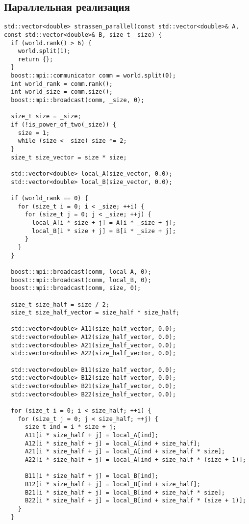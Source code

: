 \documentclass[a4paper, 14pt]{extarticle}
\begin{document}
\subsection{Параллельная реализация}
\begin{lstlisting}
std::vector<double> strassen_parallel(const std::vector<double>& A, const std::vector<double>& B, size_t _size) {
  if (world.rank() > 6) {
    world.split(1);
    return {};
  }
  boost::mpi::communicator comm = world.split(0);
  int world_rank = comm.rank();
  int world_size = comm.size();
  boost::mpi::broadcast(comm, _size, 0);

  size_t size = _size;
  if (!is_power_of_two(_size)) {
    size = 1;
    while (size < _size) size *= 2;
  }
  size_t size_vector = size * size;

  std::vector<double> local_A(size_vector, 0.0);
  std::vector<double> local_B(size_vector, 0.0);

  if (world_rank == 0) {
    for (size_t i = 0; i < _size; ++i) {
      for (size_t j = 0; j < _size; ++j) {
        local_A[i * size + j] = A[i * _size + j];
        local_B[i * size + j] = B[i * _size + j];
      }
    }
  }

  boost::mpi::broadcast(comm, local_A, 0);
  boost::mpi::broadcast(comm, local_B, 0);
  boost::mpi::broadcast(comm, size, 0);

  size_t size_half = size / 2;
  size_t size_half_vector = size_half * size_half;

  std::vector<double> A11(size_half_vector, 0.0);
  std::vector<double> A12(size_half_vector, 0.0);
  std::vector<double> A21(size_half_vector, 0.0);
  std::vector<double> A22(size_half_vector, 0.0);

  std::vector<double> B11(size_half_vector, 0.0);
  std::vector<double> B12(size_half_vector, 0.0);
  std::vector<double> B21(size_half_vector, 0.0);
  std::vector<double> B22(size_half_vector, 0.0);

  for (size_t i = 0; i < size_half; ++i) {
    for (size_t j = 0; j < size_half; ++j) {
      size_t ind = i * size + j;
      A11[i * size_half + j] = local_A[ind];
      A12[i * size_half + j] = local_A[ind + size_half];
      A21[i * size_half + j] = local_A[ind + size_half * size];
      A22[i * size_half + j] = local_A[ind + size_half * (size + 1)];

      B11[i * size_half + j] = local_B[ind];
      B12[i * size_half + j] = local_B[ind + size_half];
      B21[i * size_half + j] = local_B[ind + size_half * size];
      B22[i * size_half + j] = local_B[ind + size_half * (size + 1)];
    }
  }


\end{lstlisting}
\end{document}
